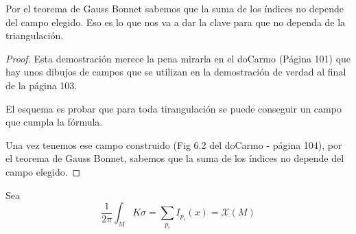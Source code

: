 Por el teorema de Gauss Bonnet sabemos que la suma de los índices no depende del campo elegido. Eso es lo que nos va a dar la clave para que no dependa de la triangulación.

\begin{proof}
Esta demostración merece la pena mirarla en el doCarmo (Página 101) que hay unos dibujos de campos que se utilizan en la demostración de verdad al final de la página 103.

El esquema es probar que para toda tirangulación se puede conseguir un campo que cumpla la fórmula.

Una vez tenemos ese campo construido (Fig 6.2 del doCarmo - página 104), por el teorema de Gauss Bonnet, sabemos que la suma de los índices no depende del campo elegido.

\end{proof}

\begin{theorem}
Sea
\[\frac{1}{2π} \int_M Kσ = \sum_{p_i} I_{p_i}(x) = \mathcal{X}(M)\]
\end{theorem}
